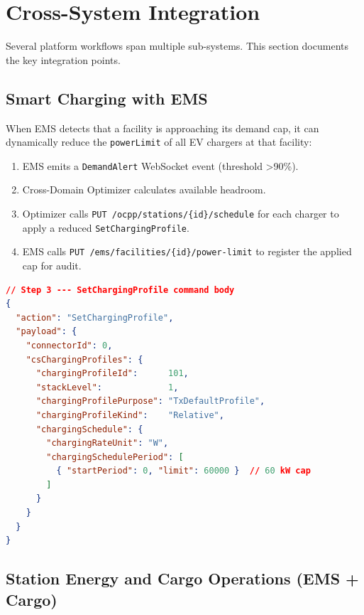 \documentclass{article}
\begin{document}
\newpage

\section{Cross-System Integration}

Several platform workflows span multiple sub-systems. This section documents the
key integration points.

\subsection{Smart Charging with EMS}

When EMS detects that a facility is approaching its demand cap, it can dynamically
reduce the \texttt{powerLimit} of all EV chargers at that facility:

\begin{enumerate}[leftmargin=*, label=\arabic*.]
    \item EMS emits a \texttt{DemandAlert} WebSocket event (threshold \textgreater 90\%).
    \item Cross-Domain Optimizer calculates available headroom.
    \item Optimizer calls \texttt{PUT /ocpp/stations/\{id\}/schedule} for each charger
          to apply a reduced \texttt{SetChargingProfile}.
    \item EMS calls \texttt{PUT /ems/facilities/\{id\}/power-limit} to register the
          applied cap for audit.
\end{enumerate}

\begin{lstlisting}[language=json, caption=Smart-charging coordination payload]
// Step 3 --- SetChargingProfile command body
{
  "action": "SetChargingProfile",
  "payload": {
    "connectorId": 0,
    "csChargingProfiles": {
      "chargingProfileId":      101,
      "stackLevel":             1,
      "chargingProfilePurpose": "TxDefaultProfile",
      "chargingProfileKind":    "Relative",
      "chargingSchedule": {
        "chargingRateUnit": "W",
        "chargingSchedulePeriod": [
          { "startPeriod": 0, "limit": 60000 }  // 60 kW cap
        ]
      }
    }
  }
}
\end{lstlisting}

\subsection{Station Energy and Cargo Operations (EMS + Cargo)}
\end{document}
